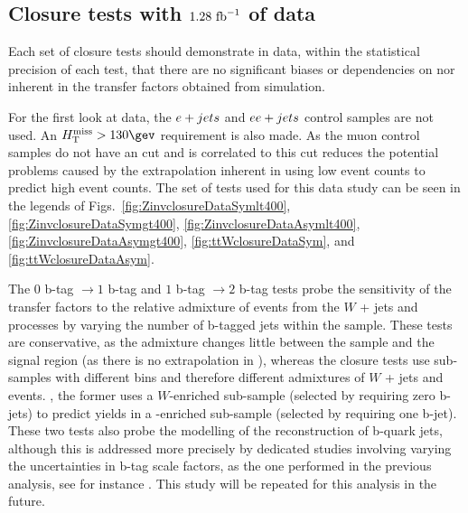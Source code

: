 \subsection{Closure tests with $1.28~\text{fb}^{-1}$ of data}
\label{sec:closure-data-study}

Each set of closure tests should demonstrate in data, within the
statistical precision of each test, that there are no significant
biases or dependencies on \njet nor \scalht inherent in the transfer
factors obtained from simulation. 

For the first look at data, the $e + jets$ and $ee + jets$ control samples are
not used. An $\mht>130\gev$ requirement is also made. As the muon
control samples do not have an \alphat cut and \mht is correlated to
\alphat this cut reduces the potential problems
caused by the extrapolation inherent in using low \mht event counts to
predict high \mht event counts.
The set of tests used for
this data study can be seen in the legends of
Figs.~\ref{fig:ZinvclosureDataSymlt400},
\ref{fig:ZinvclosureDataSymgt400}, \ref{fig:ZinvclosureDataAsymlt400}, 
\ref{fig:ZinvclosureDataAsymgt400}, \ref{fig:ttWclosureDataSym}, and 
\ref{fig:ttWclosureDataAsym}.

The $0$ b-tag $\rightarrow1$ b-tag and $1$ b-tag $\rightarrow2$ b-tag
tests probe the
sensitivity of the transfer factors to the relative admixture of
events from the $W$ + jets and \ttbar processes by varying the number
of b-tagged jets within the \mj sample. These tests are conservative,
as the admixture changes little between the \mj sample and the signal
region (as there is no extrapolation in \nb), whereas the closure
tests use sub-samples with different \nb bins and therefore different
admixtures of $W$ + jets and \ttbar events. \eg, the former uses a
$W$-enriched sub-sample (selected by requiring zero b-jets) to predict
yields in a \ttbar-enriched sub-sample (selected by requiring one
b-jet).  These two tests also probe the modelling of the
reconstruction of b-quark jets, although this is addressed more
precisely by dedicated studies involving varying the uncertainties in
b-tag scale factors, as the one performed in the previous analysis,
see for instance \cite{CMS_AN_2013-366}. This study will be repeated
for this analysis in the future.

